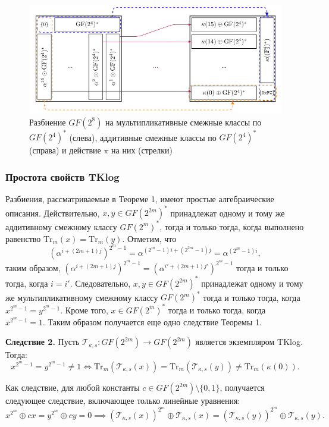 \begin{figure}
  \centering
  \includegraphics[scale=0.7]{contents/pics/cosets.png}
  \caption{Разбиение $GF(2^8)$ на мультипликативные смежные классы по $GF(2^4)^*$ (слева), аддитивные смежные классы по $GF(2^4)^*$ (справа) и действие $\pi$ на них (стрелки)}
  \label{fig:fig02}
\end{figure}

\subsubsection{Простота свойств TKlog}
Разбиения, рассматриваемые в Теореме 1, имеют простые алгебраические описания. Действительно,
\( x, y \in GF(2^{2m})^{\ast} \) принадлежат одному и тому же аддитивному смежному классу \( GF(2^m)^{\ast} \), тогда и только тогда, когда выполнено равенство \( \text{Tr}_m(x) = \text{Tr}_m(y) \).
Отметим, что
\[
\left(\alpha^{i+(2m+1)j}\right)^{2^m-1} = \alpha^{(2^m-1)i+(2^{2m}-1)j} = \alpha^{(2^m-1)i},
\]
таким образом, $\left(\alpha^{i+(2m+1)j}\right)^{2^m-1} = \left(\alpha^{i'+(2m+1)j'}\right)^{2^m-1}$ тогда и только тогда, когда \( i = i' \). Следовательно, \( x, y \in GF(2^{2m})^{\ast} \) принадлежат одному и тому же мультипликативному смежному классу \( GF(2^m)^{\ast} \) тогда и только тогда, когда \( x^{2^m-1} = y^{2^m-1} \). Кроме того, \( x \in GF(2^m)^{\ast} \) тогда и только тогда, когда \( x^{2^m-1} = 1 \). Таким образом получается еще одно следствие Теоремы 1.

\textbf{Следствие 2.} Пусть \( \mathscr{T}_{\kappa,s} : GF(2^{2m}) \to GF(2^{2m}) \) является экземпляром TKlog. Тогда:
\[
x^{2^m-1} = y^{2^m-1} \neq 1 \Leftrightarrow \text{Tr}_m(\mathscr{T}_{\kappa,s}(x)) = \text{Tr}_m(\mathscr{T}_{\kappa,s}(y)) \neq \text{Tr}_m(\kappa(0)).
\]

Как следствие, для любой константы \( c \in GF(2^{2m}) \setminus \{0, 1\} \), получается следующее следствие, включающее только линейные уравнения:
\[
x^{2^m} \oplus cx = y^{2^m} \oplus cy = 0 \implies (\mathscr{T}_{\kappa,s}(x))^{2^m} \oplus \mathscr{T}_{\kappa,s}(x) = (\mathscr{T}_{\kappa,s}(y))^{2^m} \oplus \mathscr{T}_{\kappa,s}(y).
\]

